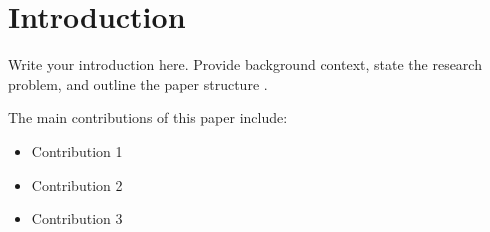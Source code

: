 \documentclass[macnew, en]{manuscript}
\begin{document}



\section{Introduction}
\label{sec:intro}

Write your introduction here. Provide background context, state the research problem, 
and outline the paper structure \cite{zurekProbabilitiesEntanglementBorns2005}.

The main contributions of this paper include:
\begin{itemize}
    \item Contribution 1
    \item Contribution 2
    \item Contribution 3
\end{itemize}
\end{document}
